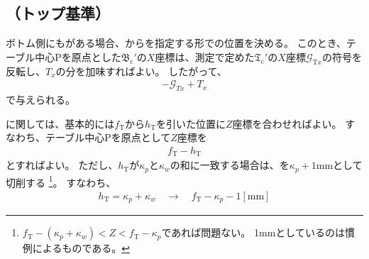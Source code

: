 \subsection{\BottomOutcutCenter（トップ基準）}
ボトム側にも\Outcut がある場合、\TopOutcutCenter から\CenterlineEndFaceDifAC を指定する形で\BottomOutcutCenter の位置を決める。
このとき、テーブル中心Pを原点とした\BottomOutcutCenter$\mathfrak B_\mathrm c'$の$X$座標は、測定で定めた$\mathfrak T_\mathrm c'$の$X$座標$\mathcal G_{\mathrm Tx}$の符号を反転し、\CenterlineEndFaceDifAC$T_x$の分を加味すればよい。
したがって、
\begin{align}
  \label{eq:TbasedTx}
  -\mathcal G_{Tx}+T_x
\end{align}
で与えられる。



\clearpage
\modHeadsection{\TopOutcutLength}
\TopOutcutLength に関しては、基本的には\AlocationLength$f_\mathrm T$から\TopOutcutLength$h_\mathrm T$を引いた位置に$Z$座標を合わせればよい。
すなわち、テーブル中心Pを原点として$Z$座標を
\begin{align*}
  f_\mathrm T - h_\mathrm T
\end{align*}
とすればよい。
ただし、\TopOutcutLength$h_\mathrm T$が\KeywayPos$\kappa_p$と\KeywayWidth$\kappa_w$の和に一致する場合は、\TopOutcutLength を$\kappa_p+1$mmとして切削する
\footnote{$f_\mathrm T-(\kappa_p+\kappa_w) < Z < f_\mathrm T-\kappa_p$であれば問題ない。
1mmとしているのは慣例によるものである。}。
すなわち、
\begin{align*}
  h_\mathrm T = \kappa_p+\kappa_w \quad \longrightarrow \quad f_\mathrm T-\kappa_p-1[\mathrm{mm}]
\end{align*}



